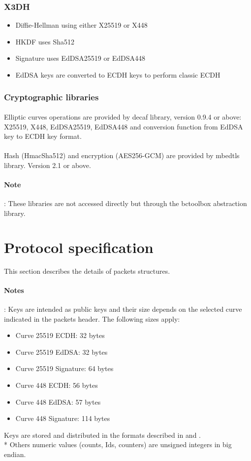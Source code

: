 \documentclass[a4paper,11pt]{article}
\begin{document}
    \subsubsection{X3DH}
      \begin{itemize}
        \item Diffie-Hellman using either X25519 or X448
        \item HKDF uses Sha512
        \item Signature uses EdDSA25519 or EdDSA448
        \item EdDSA keys are converted to ECDH keys to perform classic ECDH
      \end{itemize}
  
  \subsubsection{Cryptographic libraries}
    \paragraph{}Elliptic curves operations are provided by decaf library\cite{libdecaf}, version 0.9.4 or above: X25519, X448, EdDSA25519, EdDSA448 and conversion function from EdDSA key to ECDH key format.
    \paragraph{}Hash (HmacSha512) and encryption (AES256-GCM) are provided by mbedtls library\cite{libmbedtls}. Version 2.1 or above.
    \paragraph{Note}: These libraries are not accessed directly but through the bctoolbox abstraction library.

\section{Protocol specification}
  This section describes the details of packets structures.
  \paragraph*{Notes}: Keys are intended as public keys and their size depends on the selected curve indicated in the packets header. The following sizes apply:
  \begin{itemize}
    \item Curve 25519 ECDH: 32 bytes
    \item Curve 25519 EdDSA: 32 bytes
    \item Curve 25519 Signature: 64 bytes
    \item Curve 448 ECDH: 56 bytes
    \item Curve 448 EdDSA: 57 bytes
    \item Curve 448 Signature: 114 bytes
  \end{itemize}
  Keys are stored and distributed in the formats described in \cite{rfc7748} and \cite{rfc8032}.\\*
  Others numeric values (counts, Ids, counters) are unsigned integers in big endian.
  
\end{document}
